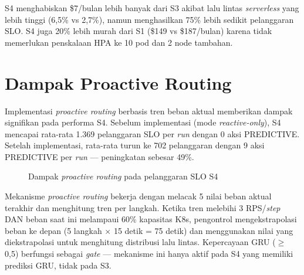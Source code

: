 S4 menghabiskan \$7/bulan lebih banyak dari S3 akibat lalu lintas \emph{serverless} yang lebih tinggi (6,5\% vs 2,7\%), namun menghasilkan 75\% lebih sedikit pelanggaran SLO. S4 juga 20\% lebih murah dari S1 (\$149 vs \$187/bulan) karena tidak memerlukan penskalaan HPA ke 10 pod dan 2 node tambahan.

\section{Dampak Proactive Routing}
\label{sec:proactive-impact}

Implementasi \emph{proactive routing} berbasis tren beban aktual memberikan dampak signifikan pada performa S4. Sebelum implementasi (mode \emph{reactive-only}), S4 mencapai rata-rata 1.369 pelanggaran SLO per \emph{run} dengan 0 aksi PREDICTIVE. Setelah implementasi, rata-rata turun ke 702 pelanggaran dengan 9 aksi PREDICTIVE per \emph{run} — peningkatan sebesar 49\%.

\begin{figure}[htbp]
    \centering
    \caption{Dampak \emph{proactive routing} pada pelanggaran SLO S4}
    \label{fig:proactive-impact}
\end{figure}

Mekanisme \emph{proactive routing} bekerja dengan melacak 5 nilai beban aktual terakhir dan menghitung tren per langkah. Ketika tren melebihi 3 RPS/\emph{step} DAN beban saat ini melampaui 60\% kapasitas K8s, pengontrol mengekstrapolasi beban ke depan (5 langkah $\times$ 15 detik = 75 detik) dan menggunakan nilai yang diekstrapolasi untuk menghitung distribusi lalu lintas. Kepercayaan GRU ($\geq$ 0,5) berfungsi sebagai \emph{gate} — mekanisme ini hanya aktif pada S4 yang memiliki prediksi GRU, tidak pada S3.

